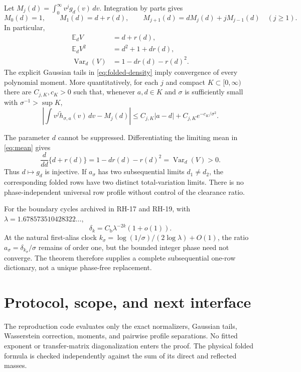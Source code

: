 \documentclass[11pt]{article}
\theoremstyle{remark}
\begin{document}
Let $M_j(d)=\int_0^\infty v^j g_d(v)\,dv$.  Integration by parts gives
\begin{equation}\label{eq:moment-recurrence}
 M_0(d)=1,\qquad M_1(d)=d+r(d),\qquad
 M_{j+1}(d)=dM_j(d)+jM_{j-1}(d)\quad(j\ge1).
\end{equation}
In particular,
\begin{align}
 \mathbb E_d V&=d+r(d),\label{eq:mean}\\
 \mathbb E_d V^2&=d^2+1+d r(d),\label{eq:second}\\
 \operatorname{Var}_d(V)&=1-d r(d)-r(d)^2.\label{eq:variance}
\end{align}
The explicit Gaussian tails in \eqref{eq:folded-density} imply convergence of
every polynomial moment.  More quantitatively, for each $j$ and compact
$K\subset[0,\infty)$ there are $C_{j,K},c_K>0$ such that, whenever
$a,d\in K$ and $\sigma$ is sufficiently small with $\sigma^{-1}>\sup K$,
\begin{equation}\label{eq:moment-bound}
 \left|\int v^j\widetilde h_{\sigma,a}(v)\,dv-M_j(d)\right|
 \le C_{j,K}|a-d|+C_{j,K}e^{-c_K/\sigma^2}.
\end{equation}

The parameter $d$ cannot be suppressed.  Differentiating the limiting mean
in \eqref{eq:mean} gives
\begin{equation}\label{eq:mean-derivative}
 \frac{d}{dd}\{d+r(d)\}
 =1-d r(d)-r(d)^2
 =\operatorname{Var}_d(V)>0.
\end{equation}
Thus $d\mapsto g_d$ is injective.  If $a_\sigma$ has two subsequential limits
$d_1\ne d_2$, the corresponding folded rows have two distinct total-variation
limits.  There is no phase-independent universal row profile without control
of the clearance ratio.

For the boundary cycles archived in RH-17 and RH-19, with
$\lambda=1.678573510428322\ldots$,
\[
 \delta_k=C_{\mathrm b}\lambda^{-2k}(1+o(1)).
\]
At the natural first-alias clock
$k_\sigma=\log(1/\sigma)/(2\log\lambda)+O(1)$, the ratio
$a_\sigma=\delta_{k_\sigma}/\sigma$ remains of order one, but the bounded
integer phase need not converge.  The theorem therefore supplies a complete
subsequential one-row dictionary, not a unique phase-free replacement.

\section{Protocol, scope, and next interface}

The reproduction code evaluates only the exact normalizers, Gaussian tails,
Wasserstein correction, moments, and pairwise profile separations.  No fitted
exponent or transfer-matrix diagonalization enters the proof.  The physical
folded formula is checked independently against the sum of its direct and
reflected masses.
\end{document}
